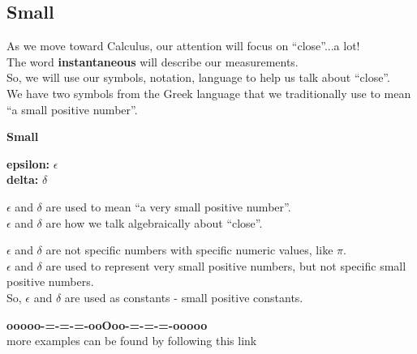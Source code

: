 \documentclass{ximera}
\begin{document}
\subsection*{Small}



As we move toward Calculus, our attention will focus on ``close''...a lot! \\


The word \textbf{instantaneous} will describe our measurements. \\


So, we will use our symbols, notation, language to help us talk about ``close''. \\


We have two symbols from the Greek language that we traditionally use to mean ``a small positive number''. \\



\begin{notation} \textbf{\textcolor{red!80!black}{Small}} 


\textbf{\textcolor{blue!55!black}{epsilon:}}  $\epsilon$ \\

\textbf{\textcolor{blue!55!black}{delta:}}  $\delta$ \\


\end{notation}

$\epsilon$ and $\delta$ are used to mean ``a very small positive number''. \\  


$\epsilon$ and $\delta$ are how we talk algebraically about ``close''. \\





\begin{warning}


$\epsilon$ and $\delta$ are not specific numbers with specific numeric values, like $\pi$. \\


$\epsilon$ and $\delta$ are used to represent very small positive numbers, but not specific small positive numbers. \\


So, $\epsilon$ and $\delta$ are used as constants - small positive constants.





\end{warning}








\begin{center}
\textbf{\textcolor{green!50!black}{ooooo-=-=-=-ooOoo-=-=-=-ooooo}} \\

more examples can be found by following this link\\ 

\end{center}
\end{document}
